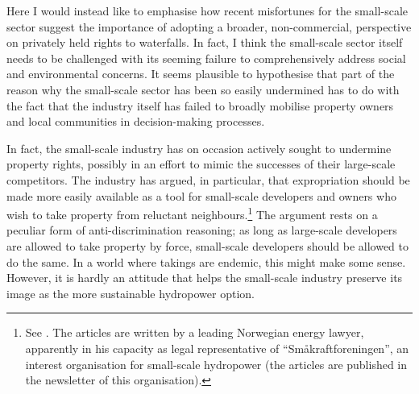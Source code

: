 Here I would instead like to emphasise how recent misfortunes for the small-scale sector suggest the importance of adopting a broader, non-commercial, perspective on privately held rights to waterfalls. In fact, I think the small-scale sector itself needs to be challenged with its seeming failure to comprehensively address social and environmental concerns. It seems plausible to hypothesise that part of the reason why the small-scale sector has been so easily undermined has to do with the fact that the industry itself has failed to broadly mobilise property owners and local communities in decision-making processes.

In fact, the small-scale industry has on occasion actively sought to undermine property rights, possibly in an effort to mimic the successes of their large-scale competitors. The industry has argued, in particular, that expropriation should be made more easily available as a tool for small-scale developers and owners who wish to take property from reluctant neighbours.\footnote{See \cite{brekken07,brekken08}. The articles are written by a leading Norwegian energy lawyer, apparently in his capacity as legal representative of ``Småkraftforeningen'', an interest organisation for small-scale hydropower (the articles are published in the newsletter of this organisation).} The argument rests on a peculiar form of anti-discrimination reasoning; as long as large-scale developers are allowed to take property by force, small-scale developers should be allowed to do the same. In a world where takings are endemic, this might make some sense. However, it is hardly an attitude that helps the small-scale industry preserve its image as the more sustainable hydropower option.


